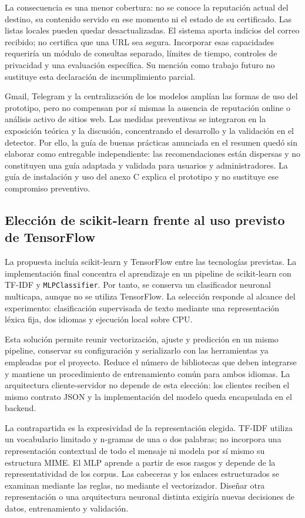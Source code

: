 La consecuencia es una menor cobertura: no se conoce la reputación actual del destino, su contenido servido en ese momento ni el estado de su certificado. Las listas locales pueden quedar desactualizadas. El sistema aporta indicios del correo recibido; no certifica que una URL sea segura. Incorporar esas capacidades requeriría un módulo de consultas separado, límites de tiempo, controles de privacidad y una evaluación específica. Su mención como trabajo futuro no sustituye esta declaración de incumplimiento parcial.

Gmail, Telegram y la centralización de los modelos amplían las formas de uso del prototipo, pero no compensan por sí mismas la ausencia de reputación online o análisis activo de sitios web. Las medidas preventivas se integraron en la exposición teórica y la discusión, concentrando el desarrollo y la validación en el detector. Por ello, la guía de buenas prácticas anunciada en el resumen quedó sin elaborar como entregable independiente: las recomendaciones están dispersas y no constituyen una guía adaptada y validada para usuarios y administradores. La guía de instalación y uso del anexo C explica el prototipo y no sustituye ese compromiso preventivo.

\subsection{Elección de scikit-learn frente al uso previsto de TensorFlow}
\label{sec:decision-tensorflow}

La propuesta incluía scikit-learn y TensorFlow entre las tecnologías previstas. La implementación final concentra el aprendizaje en un pipeline de scikit-learn con TF-IDF y \texttt{MLPClassifier}. Por tanto, se conserva un clasificador neuronal multicapa, aunque no se utiliza TensorFlow. La selección responde al alcance del experimento: clasificación supervisada de texto mediante una representación léxica fija, dos idiomas y ejecución local sobre CPU.

Esta solución permite reunir vectorización, ajuste y predicción en un mismo pipeline, conservar su configuración y serializarlo con las herramientas ya empleadas por el proyecto. Reduce el número de bibliotecas que deben integrarse y mantiene un procedimiento de entrenamiento común para ambos idiomas. La arquitectura cliente-servidor no depende de esta elección: los clientes reciben el mismo contrato JSON y la implementación del modelo queda encapsulada en el backend.

La contrapartida es la expresividad de la representación elegida. TF-IDF utiliza un vocabulario limitado y n-gramas de una o dos palabras; no incorpora una representación contextual de todo el mensaje ni modela por sí mismo su estructura MIME. El MLP aprende a partir de esos rasgos y depende de la representatividad de los corpus. Las cabeceras y los enlaces estructurados se examinan mediante las reglas, no mediante el vectorizador. Diseñar otra representación o una arquitectura neuronal distinta exigiría nuevas decisiones de datos, entrenamiento y validación.

